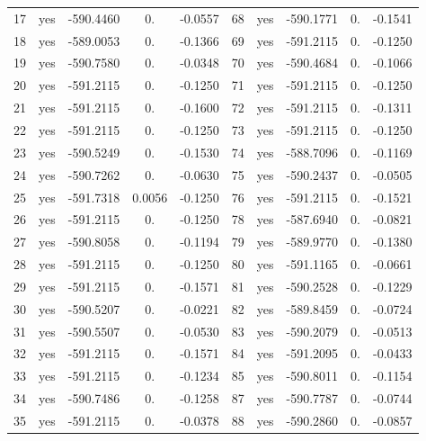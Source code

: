 \begin{table}[h]
{\begin{tabular}{cccccccccc}
        17 & yes &  -590.4460 & 0.     &  -0.0557 &    68 & yes &  -590.1771 & 0.     &  -0.1541 \\
        18 & yes &  -589.0053 & 0.     &  -0.1366 &    69 & yes &  -591.2115 & 0.     &  -0.1250 \\
        19 & yes &  -590.7580 & 0.     &  -0.0348 &    70 & yes &  -590.4684 & 0.     &  -0.1066 \\
        20 & yes &  -591.2115 & 0.     &  -0.1250 &    71 & yes &  -591.2115 & 0.     &  -0.1250 \\
        21 & yes &  -591.2115 & 0.     &  -0.1600 &    72 & yes &  -591.2115 & 0.     &  -0.1311 \\
        22 & yes &  -591.2115 & 0.     &  -0.1250 &    73 & yes &  -591.2115 & 0.     &  -0.1250 \\
        23 & yes &  -590.5249 & 0.     &  -0.1530 &    74 & yes &  -588.7096 & 0.     &  -0.1169 \\
        24 & yes &  -590.7262 & 0.     &  -0.0630 &    75 & yes &  -590.2437 & 0.     &  -0.0505 \\
        25 & yes &  -591.7318 & 0.0056 &  -0.1250 &    76 & yes &  -591.2115 & 0.     &  -0.1521 \\
        26 & yes &  -591.2115 & 0.     &  -0.1250 &    78 & yes &  -587.6940 & 0.     &  -0.0821 \\
        27 & yes &  -590.8058 & 0.     &  -0.1194 &    79 & yes &  -589.9770 & 0.     &  -0.1380 \\
        28 & yes &  -591.2115 & 0.     &  -0.1250 &    80 & yes &  -591.1165 & 0.     &  -0.0661 \\
        29 & yes &  -591.2115 & 0.     &  -0.1571 &    81 & yes &  -590.2528 & 0.     &  -0.1229 \\
        30 & yes &  -590.5207 & 0.     &  -0.0221 &    82 & yes &  -589.8459 & 0.     &  -0.0724 \\
        31 & yes &  -590.5507 & 0.     &  -0.0530 &    83 & yes &  -590.2079 & 0.     &  -0.0513 \\
        32 & yes &  -591.2115 & 0.     &  -0.1571 &    84 & yes &  -591.2095 & 0.     &  -0.0433 \\
        33 & yes &  -591.2115 & 0.     &  -0.1234 &    85 & yes &  -590.8011 & 0.     &  -0.1154 \\
        34 & yes &  -590.7486 & 0.     &  -0.1258 &    87 & yes &  -590.7787 & 0.     &  -0.0744 \\
        35 & yes &  -591.2115 & 0.     &  -0.0378 &    88 & yes &  -590.2860 & 0.     &  -0.0857 \\

\end{tabular}}
\end{table}

